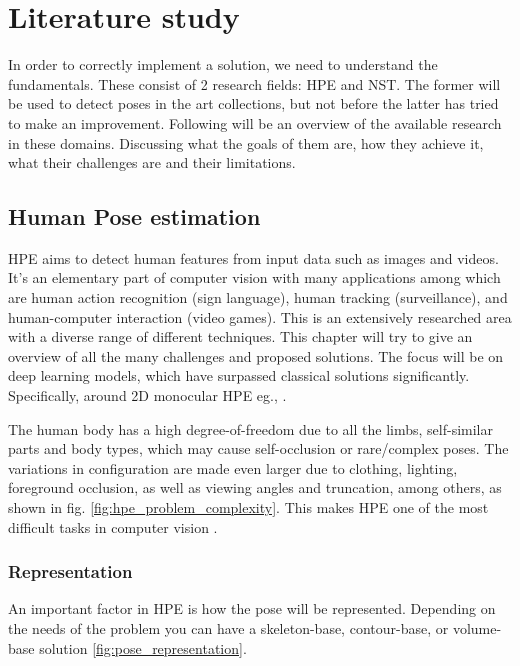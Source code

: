 \chapter{Literature study}
\label{chap:rel_work}
In order to correctly implement a solution, we need to understand the fundamentals.
These consist of 2 research fields: \gls{HPE} and \gls{NST}.
The former will be used to detect poses in the art collections, but not before the latter has tried to make an improvement.
Following will be an overview of the available research in these domains.
Discussing what the goals of them are, how they achieve it, what their challenges are and their limitations.

\section{Human Pose estimation}
\label{sec:hpe}

\gls{HPE} aims to detect human features from input data such as images and videos.
It's an elementary part of computer vision with many applications among which are human action recognition (sign language), human tracking (surveillance), and human-computer interaction (video games).
This is an extensively researched area with a diverse range of different techniques.
This chapter will try to give an overview of all the many challenges and proposed solutions.
The focus will be on deep learning models, which have surpassed classical solutions significantly.
Specifically, around 2D monocular \gls{HPE} eg., \cite{Munea2020}\cite{Zheng2012}\cite{Liu2104}\cite{chen2022}.

The human body has a high degree-of-freedom due to all the limbs, self-similar parts and body types, which may cause self-occlusion or rare/complex poses.
The variations in configuration are made even larger due to clothing, lighting, foreground occlusion, as well as viewing angles and truncation, among others, as shown in fig. \ref{fig:hpe_problem_complexity}.
This makes \gls{HPE} one of the most difficult tasks in computer vision \cite{jain2014}\cite{Chen2000}.

\subsection{Representation}
\label{section:representation}

An important factor in \gls{HPE} is how the pose will be represented.
Depending on the needs of the problem you can have a skeleton-base, contour-base, or volume-base solution \cite{Chen2000}\ref{fig:pose_representation}.

